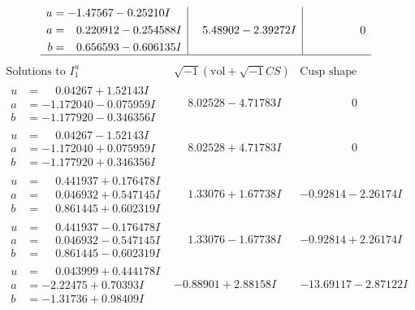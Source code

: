 \documentclass[1p]{elsarticle_modified}
\theoremstyle{definition}
\newcommand{\I}{\sqrt{-1}}
\begin{document}
$$\begin{array}{c|c|c}
\begin{aligned}
u &= -1.47567 - 0.25210 I \\
a &= \phantom{-}0.220912 - 0.254588 I \\
b &= \phantom{-}0.656593 - 0.606135 I\end{aligned}
 & \phantom{-}5.48902 - 2.39272 I & \phantom{-0.000000 } 0\\
 \hline 
 \end{array}$$\newpage$$\begin{array}{c|c|c}  
\text{Solutions to }I^u_{1}& \I (\text{vol} + \sqrt{-1}CS) & \text{Cusp shape}\\
 \hline 
\begin{aligned}
u &= \phantom{-}0.04267 + 1.52143 I \\
a &= -1.172040 - 0.075959 I \\
b &= -1.177920 - 0.346356 I\end{aligned}
 & \phantom{-}8.02528 - 4.71783 I & \phantom{-0.000000 } 0 \\ \hline\begin{aligned}
u &= \phantom{-}0.04267 - 1.52143 I \\
a &= -1.172040 + 0.075959 I \\
b &= -1.177920 + 0.346356 I\end{aligned}
 & \phantom{-}8.02528 + 4.71783 I & \phantom{-0.000000 } 0 \\ \hline\begin{aligned}
u &= \phantom{-}0.441937 + 0.176478 I \\
a &= \phantom{-}0.046932 + 0.547145 I \\
b &= \phantom{-}0.861445 + 0.602319 I\end{aligned}
 & \phantom{-}1.33076 + 1.67738 I & -0.92814 - 2.26174 I \\ \hline\begin{aligned}
u &= \phantom{-}0.441937 - 0.176478 I \\
a &= \phantom{-}0.046932 - 0.547145 I \\
b &= \phantom{-}0.861445 - 0.602319 I\end{aligned}
 & \phantom{-}1.33076 - 1.67738 I & -0.92814 + 2.26174 I \\ \hline\begin{aligned}
u &= \phantom{-}0.043999 + 0.444178 I \\
a &= -2.22475 + 0.70393 I \\
b &= -1.31736 + 0.98409 I\end{aligned}
 & -0.88901 + 2.88158 I & -13.69117 - 2.87122 I \\ \hline\begin{aligned}

\end{aligned}
\end{array}$$
\end{document}
